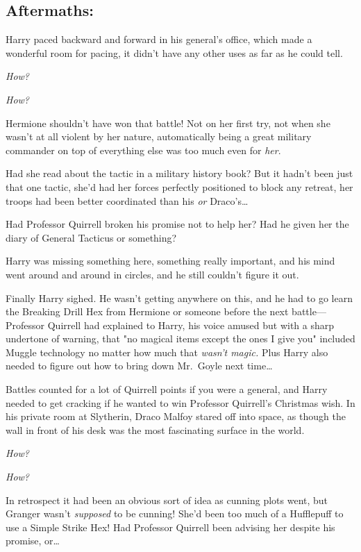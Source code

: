
\subsection{Aftermaths:}

Harry paced backward and forward in his general's office, which made a 
wonderful room for pacing, it didn't have any other uses as far as he could 
tell.

\emph{How?}

\emph{How?}

Hermione shouldn't have won that battle! Not on her first try, not when she 
wasn't at all violent by her nature, automatically being a great military 
commander on top of everything else was too much even for \emph{her}.

Had she read about the tactic in a military history book? But it hadn't been 
just that one tactic, she'd had her forces perfectly positioned to block any 
retreat, her troops had been better coordinated than his \emph{or} 
Draco's{\ldots}

Had Professor Quirrell broken his promise not to help her? Had he given her the 
diary of General Tacticus or something?

Harry was missing something here, something really important, and his mind went 
around and around in circles, and he still couldn't figure it out.

Finally Harry sighed. He wasn't getting anywhere on this, and he had to go 
learn the Breaking Drill Hex from Hermione or someone before the next 
battle---Professor Quirrell had explained to Harry, his voice amused but with a 
sharp undertone of warning, that "no magical items except the ones I give you" 
included Muggle technology no matter how much that \emph{wasn't magic.} Plus 
Harry also needed to figure out how to bring down Mr.~Goyle next time{\ldots}

Battles counted for a lot of Quirrell points if you were a general, and Harry 
needed to get cracking if he wanted to win Professor Quirrell's Christmas wish.
\sbreak
In his private room at Slytherin, Draco Malfoy stared off into space, as though 
the wall in front of his desk was the most fascinating surface in the world.

\emph{How?}

\emph{How?}

In retrospect it had been an obvious sort of idea as cunning plots went, but 
Granger wasn't \emph{supposed} to be cunning! She'd been too much of a 
Hufflepuff to use a Simple Strike Hex! Had Professor Quirrell been advising her 
despite his promise, or{\ldots}


